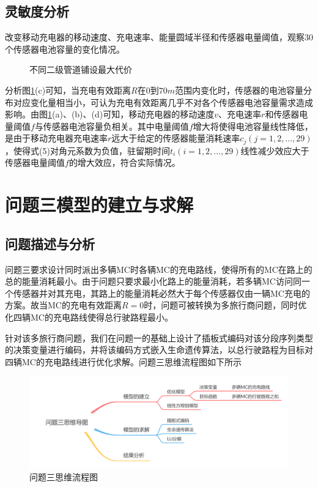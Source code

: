 \documentclass{whutmod}
\begin{document}
        \subsection{灵敏度分析}

		改变移动充电器的移动速度、充电速率、能量圆域半径和传感器电量阈值，观察$30$个传感器电池容量的变化情况。
		
	\begin{figure}[H]
		\centering
	\end{figure}	
	\begin{figure}[H]
		\centering
		\caption{不同二级管道铺设最大代价}
		\label{mgh}
	\end{figure}
		分析图\ref{mgh}(c)可知，当充电有效距离$R$在$0$到$70m$范围内变化时，传感器的电池容量分布对应变化量相当小，可认为充电有效距离几乎不对各个传感器电池容量需求造成影响。由图\ref{mgh}(a)、(b)、(d)可知，移动充电器的移动速度$v$、充电速率$r$和传感器电量阈值$f$与传感器电池容量负相关。其中电量阈值$f$增大将使得电池容量线性降低，是由于移动充电器充电速率$r$远大于给定的传感器能量消耗速率$c_j(j=1,2,...,29)$，使得式(5)对角元系数为负值，驻留期时间$t_i(i=1,2,...,29)$线性减少效应大于传感器电量阈值$f$的增大效应，符合实际情况。


    \section{问题三模型的建立与求解}
    \subsection{问题描述与分析}
    问题三要求设计同时派出多辆MC时各辆MC的充电路线，使得所有的MC在路上的总的能量消耗最小。由于问题只要求最小化路上的能量消耗，若多辆MC访问同一个传感器并对其充电，其路上的能量消耗必然大于每个传感器仅由一辆MC充电的方案。故当MC的充电有效距离$R=0$时，问题可被转换为多旅行商问题，同时优化四辆MC的充电路线使得总行驶路程最小。
    
    针对该多旅行商问题，我们在问题一的基础上设计了插板式编码对该分段序列类型的决策变量进行编码，并将该编码方式嵌入生命遗传算法，以总行驶路程为目标对四辆MC的充电路线进行优化求解。问题三思维流程图如下所示
    
    \begin{figure}[H]
    	\centering
    	\includegraphics[width=\textwidth]{figures/3.png}
    	\caption{问题三思维流程图}\label{asdf}
    \end{figure}
\end{document}
